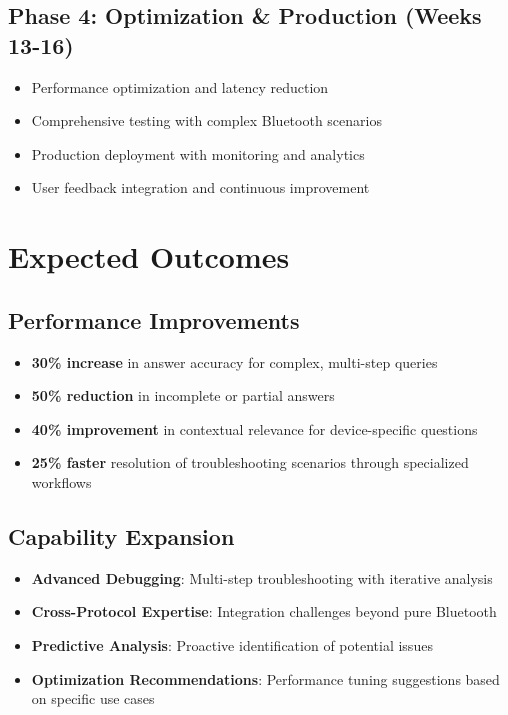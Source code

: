 \documentclass[11pt, a4paper]{article}
\begin{document}
\subsection{Phase 4: Optimization \& Production (Weeks 13-16)}
\begin{itemize}
    \item Performance optimization and latency reduction
    \item Comprehensive testing with complex Bluetooth scenarios
    \item Production deployment with monitoring and analytics
    \item User feedback integration and continuous improvement
\end{itemize}

\section{Expected Outcomes}

\subsection{Performance Improvements}
\begin{itemize}
    \item \textbf{30\% increase} in answer accuracy for complex, multi-step queries
    \item \textbf{50\% reduction} in incomplete or partial answers
    \item \textbf{40\% improvement} in contextual relevance for device-specific questions
    \item \textbf{25\% faster} resolution of troubleshooting scenarios through specialized workflows
\end{itemize}

\subsection{Capability Expansion}
\begin{itemize}
    \item \textbf{Advanced Debugging}: Multi-step troubleshooting with iterative analysis
    \item \textbf{Cross-Protocol Expertise}: Integration challenges beyond pure Bluetooth
    \item \textbf{Predictive Analysis}: Proactive identification of potential issues
    \item \textbf{Optimization Recommendations}: Performance tuning suggestions based on specific use cases
\end{itemize}
\end{document}
